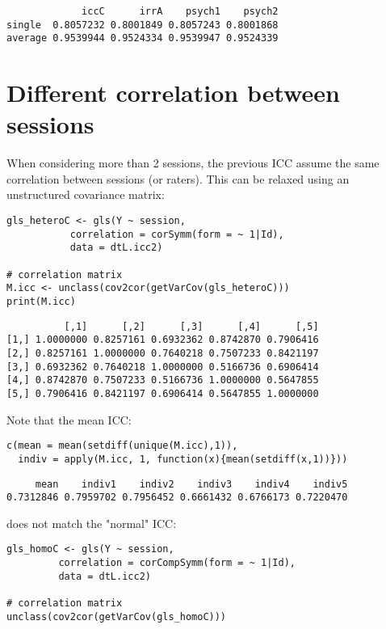 \documentclass[12pt]{article}
\begin{document}
\begin{verbatim}
             iccC      irrA    psych1    psych2
single  0.8057232 0.8001849 0.8057243 0.8001868
average 0.9539944 0.9524334 0.9539947 0.9524339
\end{verbatim}

\clearpage

\section{Different correlation between sessions}
\label{sec:orgd8b384c}

When considering more than 2 sessions, the previous ICC assume the
same correlation between sessions (or raters). This can be relaxed
using an unstructured covariance matrix:

\begin{lstlisting}
gls_heteroC <- gls(Y ~ session,
		   correlation = corSymm(form = ~ 1|Id),
		   data = dtL.icc2)

# correlation matrix
M.icc <- unclass(cov2cor(getVarCov(gls_heteroC)))
print(M.icc)
\end{lstlisting}

\begin{verbatim}
          [,1]      [,2]      [,3]      [,4]      [,5]
[1,] 1.0000000 0.8257161 0.6932362 0.8742870 0.7906416
[2,] 0.8257161 1.0000000 0.7640218 0.7507233 0.8421197
[3,] 0.6932362 0.7640218 1.0000000 0.5166736 0.6906414
[4,] 0.8742870 0.7507233 0.5166736 1.0000000 0.5647855
[5,] 0.7906416 0.8421197 0.6906414 0.5647855 1.0000000
\end{verbatim}

Note that the mean ICC:
\begin{lstlisting}
c(mean = mean(setdiff(unique(M.icc),1)), 
  indiv = apply(M.icc, 1, function(x){mean(setdiff(x,1))}))
\end{lstlisting}

\begin{verbatim}
     mean    indiv1    indiv2    indiv3    indiv4    indiv5 
0.7312846 0.7959702 0.7956452 0.6661432 0.6766173 0.7220470
\end{verbatim}

does not match the "normal" ICC:
\begin{lstlisting}
gls_homoC <- gls(Y ~ session,
		 correlation = corCompSymm(form = ~ 1|Id),
		 data = dtL.icc2)

# correlation matrix
unclass(cov2cor(getVarCov(gls_homoC)))
\end{lstlisting}
\end{document}
